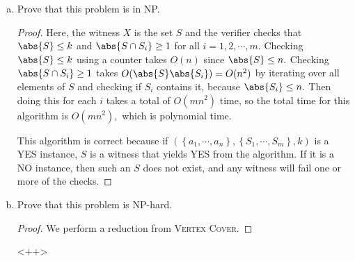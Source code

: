 \documentclass{article}
\begin{document}
\begin{enumerate}[(a)]
	\item Prove that this problem is in NP.
		\begin{proof}
			Here, the witness $X$ is the set $S$ and the verifier checks that $\abs{S}\le k$ and $\abs{S\cap S_i}\ge 1$ for all $i=1, 2, \cdots, m.$ Checking $\abs{S}\le k$ using a counter takes $O(n)$ since $\abs{S}\le n.$ Checking $\abs{S\cap S_i}\ge 1$ takes $O(\abs{S}\abs{S_i})=O(n^2)$ by iterating over all elements of $S$ and checking if $S_i$ contains it, because $\abs{S_i}\le n.$ Then doing this for each $i$ takes a total of $O(mn^2)$ time, so the total time for this algorithm is $O(mn^2),$ which is polynomial time.

			This algorithm is correct because if $(\left\{ a_1, \cdots, a_n \right\}, \left\{ S_1, \cdots, S_m \right\}, k)$ is a YES instance, $S$ is a witness that yields YES from the algorithm. If it is a NO instance, then such an $S$ does not exist, and any witness will fail one or more of the checks.
		\end{proof}

	\item Prove that this problem is NP-hard.
		\begin{proof}
			We perform a reduction from \textsc{Vertex Cover}. 
		\end{proof}<++>
		
\end{enumerate}
\end{document}
